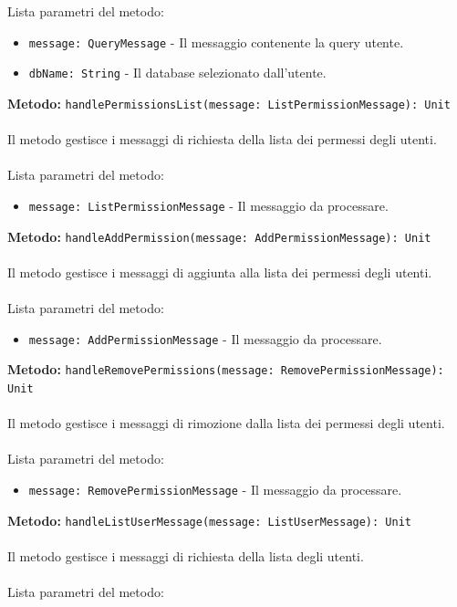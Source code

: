 \documentclass[a4paper]{article}
\begin{document}
			Lista parametri del metodo:
			\begin{itemize}
				\item \texttt{message: QueryMessage} - Il messaggio contenente la query utente.
				\item \texttt{dbName: String} - Il database selezionato dall'utente.
			\end{itemize}	
		\textbf{Metodo: }\texttt{handlePermissionsList(message: ListPermissionMessage): Unit}
			\\ \\
			Il metodo gestisce i messaggi di richiesta della lista dei permessi degli utenti.
			\\ \\
			Lista parametri del metodo:
			\begin{itemize}
				\item \texttt{message: ListPermissionMessage} - Il messaggio da processare.
			\end{itemize}	
		\textbf{Metodo: }\texttt{handleAddPermission(message: AddPermissionMessage): Unit}
			\\ \\
			Il metodo gestisce i messaggi di aggiunta alla lista dei permessi degli utenti.
			\\ \\
			Lista parametri del metodo:
			\begin{itemize}
				\item \texttt{message: AddPermissionMessage} - Il messaggio da processare.
			\end{itemize}	
		\textbf{Metodo: }\texttt{handleRemovePermissions(message: RemovePermissionMessage): Unit}
			\\ \\
			Il metodo gestisce i messaggi di rimozione dalla lista dei permessi degli utenti.
			\\ \\
			Lista parametri del metodo:
			\begin{itemize}
				\item \texttt{message: RemovePermissionMessage} - Il messaggio da processare.
			\end{itemize}	
		\textbf{Metodo: }\texttt{handleListUserMessage(message: ListUserMessage): Unit}
			\\ \\
			Il metodo gestisce i messaggi di richiesta della lista degli utenti.
			\\ \\
			Lista parametri del metodo:
\end{document}
